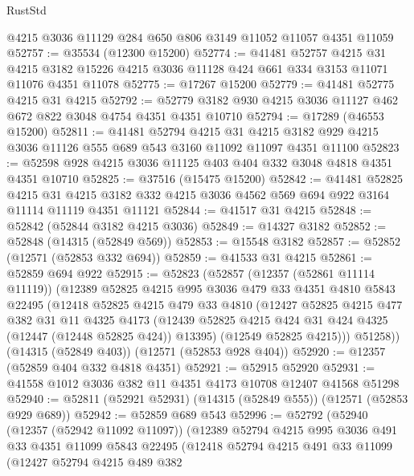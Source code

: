 \begin{lexlean}{RustStd}
\begin{coremodule}
    @4215
    @3036
    @11129
    @284
    @650
    @806
    @3149
    @11052
    @11057
    @4351
    @11059
@52757 := @35534 (@12300 @15200)
@52774 := @41481
    @52757
    @4215
    @31
    @4215
    @3182
    @15226
    @4215
    @3036
    @11128
    @424
    @661
    @334
    @3153
    @11071
    @11076
    @4351
    @11078
@52775 := @17267 @15200
@52779 := @41481 @52775 @4215 @31 @4215
@52792 := @52779 @3182 @930 @4215 @3036 @11127 @462 @672 @822 @3048 @4754 @4351 @4351 @10710
@52794 := @17289 (@46553 @15200)
@52811 := @41481
    @52794
    @4215
    @31
    @4215
    @3182
    @929
    @4215
    @3036
    @11126
    @555
    @689
    @543
    @3160
    @11092
    @11097
    @4351
    @11100
@52823 := @52598 @928 @4215 @3036 @11125 @403 @404 @332 @3048 @4818 @4351 @4351 @10710
@52825 := @37516 (@15475 @15200)
@52842 := @41481
    @52825
    @4215
    @31
    @4215
    @3182
    @332
    @4215
    @3036
    @4562
    @569
    @694
    @922
    @3164
    @11114
    @11119
    @4351
    @11121
@52844 := @41517 @31 @4215
@52848 := @52842 (@52844 @3182 @4215 @3036)
@52849 := @14327 @3182
@52852 := @52848 (@14315 (@52849 @569))
@52853 := @15548 @3182
@52857 := @52852 (@12571 (@52853 @332 @694))
@52859 := @41533 @31 @4215
@52861 := @52859 @694 @922
@52915 := @52823
    (@52857
      (@12357 (@52861 @11114 @11119))
      (@12389
        @52825
        @4215
        @995
        @3036
        @479
        @33
        @4351
        @4810
        @5843
        @22495
        (@12418
          @52825
          @4215
          @479
          @33
          @4810
          (@12427
            @52825
            @4215
            @477
            @382
            @31
            @11
            @4325
            @4173
            (@12439 @52825 @4215 @424 @31 @424 @4325 (@12447 (@12448 @52825 @424)) @13395)
            (@12549 @52825 @4215)))
        @51258))
    (@14315 (@52849 @403))
    (@12571 (@52853 @928 @404))
@52920 := @12357 (@52859 @404 @332 @4818 @4351)
@52921 := @52915 @52920
@52931 := @41558 @1012 @3036 @382 @11 @4351 @4173 @10708 @12407 @41568 @51298
@52940 := @52811 (@52921 @52931) (@14315 (@52849 @555)) (@12571 (@52853 @929 @689))
@52942 := @52859 @689 @543
@52996 := @52792
    (@52940
      (@12357 (@52942 @11092 @11097))
      (@12389
        @52794
        @4215
        @995
        @3036
        @491
        @33
        @4351
        @11099
        @5843
        @22495
        (@12418
          @52794
          @4215
          @491
          @33
          @11099
          (@12427
            @52794
            @4215
            @489
            @382

\end{coremodule}
\end{lexlean}
